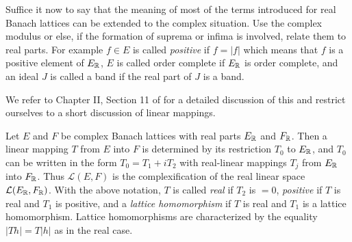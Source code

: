 Suffice it now to say that the meaning of most of the terms introduced for real Banach lattices can be extended to the complex situation.
Use the complex modulus or else, if the formation of suprema or infima is involved, relate them to real parts.
For example $ f \in E $ is called \emph{positive} if\/ $ f = |f| $ which means that $ f $ is a positive element of\/ $ E_{\mathbb{R}} $, $ E $ is called order complete if\/ $ E_{\mathbb{R}} $ is order complete, and an ideal $ J $ is called a band if the real part of\/ $ J $ is a band.

We refer to Chapter II, Section 11 of \textcite{schaefer:1974} for a detailed discussion of this and restrict ourselves to a short discussion of linear mappings.

Let $ E $ and $ F $ be complex Banach lattices with real parts $ E_{\mathbb{R}} $ and $ F_{\mathbb{R}} $.
Then a linear mapping $ T $ from $ E $ into $ F $ is determined by its restriction $ T_{0} $ to $ E_{\mathbb{R}} $, and $ T_{0} $ can be written in the form $ T_{0} = T_{1} + iT_{2} $ with real-linear mappings $ T_{j} $ from $ E_{\mathbb{R}} $ into $ F_{\mathbb{R}} $.
Thus $ \mathcal{L}(E,F) $ is the complexification of the real linear space $ \mathcal{L}(E_{\mathbb{R}},F_{\mathbb{R}}) $.
With the above notation, $ T $ is called \emph{real} if\/ $ T_{2} $ is $ = 0 $, \emph{positive} if\/ $ T $ is real and $ T_{1} $ is positive, and a \emph{lattice homomorphism} if\/ $ T $ is real and $ T_{1} $ is a lattice homomorphism.
Lattice homomorphisms are characterized by the equality $ |Th| = T|h| $ as in the real case.

